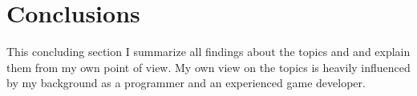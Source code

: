 \chapter{Conclusions}

This concluding section I summarize all findings about the topics \mss{} and
\ogs{} and explain them from my own point of view. My own view on the topics
is heavily influenced by my background as a programmer and an experienced game
developer.








